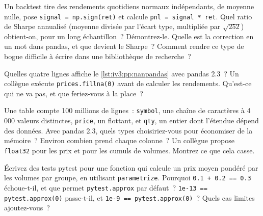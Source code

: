 \begin{question}\label{iq:iv3:python-and-pandas:23}
Un backtest tire des rendements quotidiens normaux indépendants, de moyenne nulle, pose \texttt{signal = np.sign(ret)} et calcule \texttt{pnl = signal * ret}. Quel ratio de Sharpe annualisé (moyenne divisée par l'écart type, multipliée par $\sqrt{252}$) obtient-on, pour un long échantillon~? Démontrez-le. Quelle est la correction en un mot dans pandas, et que devient le Sharpe~? Comment rendre ce type de bogue difficile à écrire dans une bibliothèque de recherche~?
\end{question}

\begin{question}\label{iq:iv3:python-and-pandas:24}
Quelles quatre lignes affiche le \cref{lst:iv3:pp:nanpandas} avec pandas 2.3~? Un collègue exécute \texttt{prices.fillna(0)} avant de calculer les rendements. Qu'est-ce qui ne va pas, et que feriez-vous à la place~?
\label{lst:iv3:pp:nanpandas}
\end{question}

\begin{question}\label{iq:iv3:python-and-pandas:25}
Une table compte 100 millions de lignes~: \texttt{symbol}, une chaîne de caractères à 4\,000 valeurs distinctes, \texttt{price}, un flottant, et \texttt{qty}, un entier dont l'étendue dépend des données. Avec pandas 2.3, quels types choisiriez-vous pour économiser de la mémoire~? Environ combien prend chaque colonne~? Un collègue propose \texttt{float32} pour les prix et pour les cumuls de volumes. Montrez ce que cela casse.
\end{question}

\begin{question}\label{iq:iv3:python-and-pandas:26}
Écrivez des tests pytest pour une fonction qui calcule un prix moyen pondéré par les volumes par groupe, en utilisant \texttt{parametrize}. Pourquoi \texttt{0.1 + 0.2 == 0.3} échoue-t-il, et que permet \texttt{pytest.approx} par défaut~? \texttt{1e-13 == pytest.approx(0)} passe-t-il, et \texttt{1e-9 == pytest.approx(0)}~? Quels cas limites ajoutez-vous~?
\end{question}

